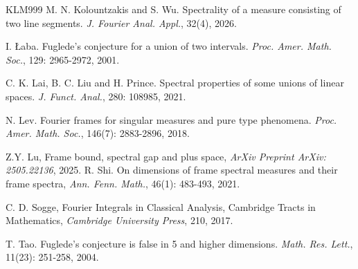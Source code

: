 \documentclass[12pt,a4paper,intlimits,sumlimits]{amsart}
\theoremstyle{plain}
\theoremstyle{definition}
\begin{document}
\begin{thebibliography}{KLM999}
 M. N. Kolountzakis and  S. Wu. Spectrality of a measure consisting of two line segments. {\em J. Fourier Anal. Appl.}, 32(4), 2026.  


  I. {\L}aba. Fuglede's conjecture for a union of two intervals. {\em Proc. Amer. Math. Soc.}, 129: 2965-2972, 2001.

 C. K. Lai, B. C. Liu and H. Prince.  Spectral properties of some unions of linear spaces. {\em J. Funct. Anal.}, 280: 108985, 2021.



 N. Lev. Fourier frames for singular measures and pure type phenomena. {\em Proc. Amer. Math. Soc.},  146(7): 2883-2896, 2018.

 Z.Y. Lu, Frame bound, spectral gap and plus space,  {\em ArXiv Preprint ArXiv: 2505.22136}, 2025.
R. Shi. On dimensions of frame spectral measures and their frame spectra, {\em Ann. Fenn. Math.},
46(1): 483-493, 2021.

C. D. Sogge, Fourier Integrals in Classical Analysis, Cambridge Tracts in Mathematics, {\em Cambridge University Press}, 210, 2017. 


T. Tao. Fuglede’s conjecture is false in 5 and higher dimensions. {\em  Math. Res. Lett.}, 11(23): 251-258, 2004.


 
\end{thebibliography}
\end{document}
